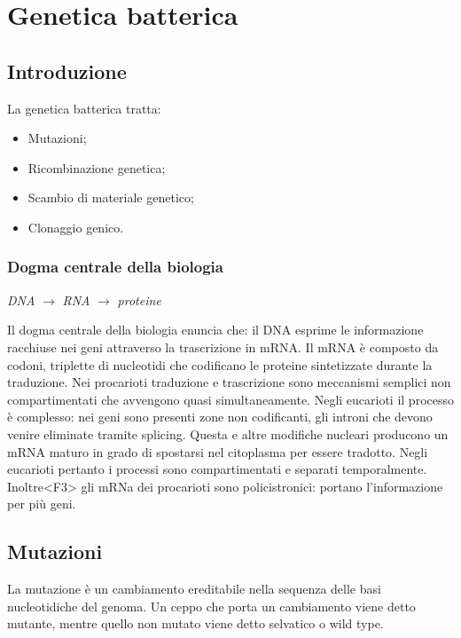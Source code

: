 \chapter{Genetica batterica}
	
\section{Introduzione}
La genetica batterica tratta: 
\begin{multicols}{2}
	\begin{itemize}
	    \item Mutazioni; 
	    \item Ricombinazione genetica; 
	    \item Scambio di materiale genetico; 
	    \item Clonaggio genico.
	\end{itemize}
\end{multicols}

	\subsection{Dogma centrale della biologia}
	\begin{center}
		\emph{DNA} $\rightarrow$ \emph{RNA} $\rightarrow$ \emph{proteine}
	\end{center}
	Il dogma centrale della biologia enuncia che: il DNA esprime le informazione racchiuse nei geni attraverso la trascrizione in mRNA. 
	Il mRNA \`e composto da codoni, triplette di nucleotidi che codificano le proteine sintetizzate durante la traduzione.
	Nei procarioti traduzione e trascrizione sono meccanismi semplici non compartimentati che avvengono quasi simultaneamente.
	Negli eucarioti il processo \`e complesso: nei geni sono presenti zone non codificanti, gli introni che devono venire eliminate tramite splicing.
	Questa e altre modifiche nucleari producono un mRNA maturo in grado di spostarsi nel citoplasma per essere tradotto.
	Negli eucarioti pertanto i processi sono compartimentati e separati temporalmente.
	Inoltre<F3> gli mRNa dei procarioti sono policistronici: portano l'informazione per pi\`u geni.

\section{Mutazioni}
La mutazione è un cambiamento ereditabile nella sequenza delle basi nucleotidiche del genoma. 
Un ceppo che porta un cambiamento viene detto mutante, mentre quello non mutato viene detto selvatico o wild type. 

